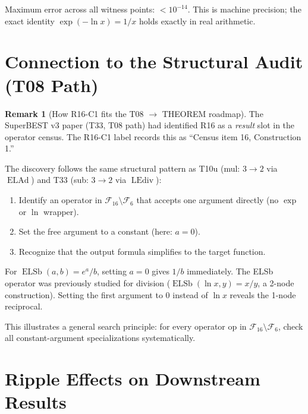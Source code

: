 \documentclass[12pt,a4paper]{article}
\theoremstyle{definition}
\newtheorem{remark}[theorem]{Remark}
\newcommand{\ELAd}{\operatorname{ELAd}}
\newcommand{\ELSb}{\operatorname{ELSb}}
\newcommand{\LEdiv}{\operatorname{LEdiv}}
\begin{document}
Maximum error across all witness points: $< 10^{-14}$.  This is machine
precision; the exact identity $\exp(-\ln x) = 1/x$ holds exactly in real
arithmetic.

\section{Connection to the Structural Audit (T08 Path)}

\begin{remark}[How R16-C1 fits the T08 $\to$ THEOREM roadmap]
\label{rem:t08path}
The SuperBEST v3 paper (T33, T08 path) had identified R16 as a
\emph{result} slot in the operator census.  The R16-C1 label records this
as ``Census item 16, Construction 1.''

The discovery follows the same structural pattern as T10u (mul: $3\to2$
via $\ELAd$) and T33 (sub: $3\to2$ via $\LEdiv$):
\begin{enumerate}
  \item Identify an operator in $\mathcal{F}_{16}\setminus\mathcal{F}_6$
        that accepts one argument directly (no $\exp$ or $\ln$ wrapper).
  \item Set the free argument to a constant (here: $a = 0$).
  \item Recognize that the output formula simplifies to the target function.
\end{enumerate}

For $\ELSb(a,b) = e^a/b$, setting $a=0$ gives $1/b$ immediately.
The ELSb operator was previously studied for division ($\ELSb(\ln x, y)
= x/y$, a 2-node construction).  Setting the first argument to $0$
instead of $\ln x$ reveals the 1-node reciprocal.

This illustrates a general search principle: for every operator $\mathrm{op}$
in $\mathcal{F}_{16}\setminus\mathcal{F}_6$, check all constant-argument
specializations systematically.
\end{remark}

\section{Ripple Effects on Downstream Results}
\end{document}
